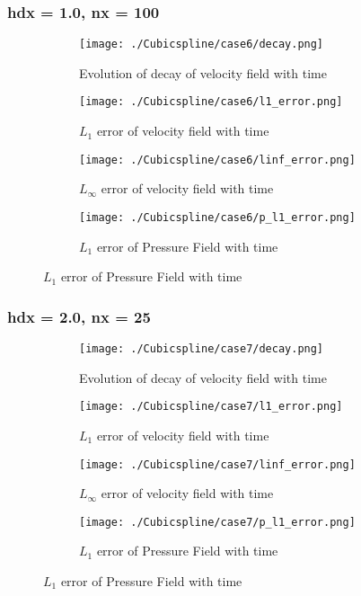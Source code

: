 \documentclass[11pt, a4paper]{article}
\begin{document}
\subsubsection{hdx = 1.0, nx = 100}
\begin{figure}[H]
\begin{subfigure}{0.48\textwidth}
\texttt{[image: ./Cubicspline/case6/decay.png]}
\caption{Evolution of decay of velocity field with time}
\end{subfigure}
\begin{subfigure}{0.48\textwidth}
\texttt{[image: ./Cubicspline/case6/l1\_error.png]}
\caption{$L_1$ error of velocity field with time}
\end{subfigure}
\medskip
\begin{subfigure}{0.48\textwidth}
\texttt{[image: ./Cubicspline/case6/linf\_error.png]}
\caption{$L_\infty$ error of velocity field with time}
\end{subfigure}
\begin{subfigure}{0.48\textwidth}
\texttt{[image: ./Cubicspline/case6/p\_l1\_error.png]}
\caption{$L_1$ error of Pressure Field with time}
\end{subfigure}
\end{figure}

\subsubsection{hdx = 2.0, nx = 25}
\begin{figure}[H]
\begin{subfigure}{0.48\textwidth}
\texttt{[image: ./Cubicspline/case7/decay.png]}
\caption{Evolution of decay of velocity field with time}
\end{subfigure}
\begin{subfigure}{0.48\textwidth}
\texttt{[image: ./Cubicspline/case7/l1\_error.png]}
\caption{$L_1$ error of velocity field with time}
\end{subfigure}
\medskip
\begin{subfigure}{0.48\textwidth}
\texttt{[image: ./Cubicspline/case7/linf\_error.png]}
\caption{$L_\infty$ error of velocity field with time}
\end{subfigure}
\begin{subfigure}{0.48\textwidth}
\texttt{[image: ./Cubicspline/case7/p\_l1\_error.png]}
\caption{$L_1$ error of Pressure Field with time}
\end{subfigure}
\end{figure}
\end{document}
